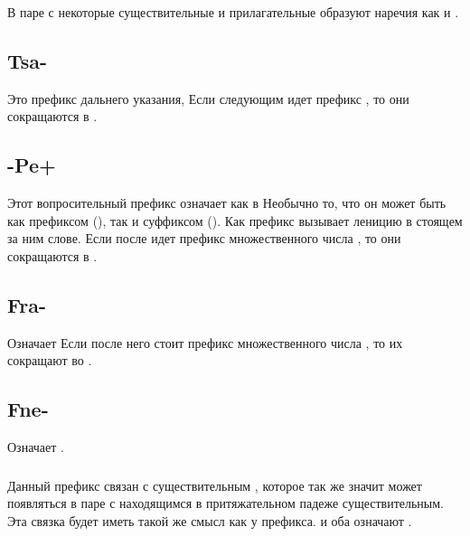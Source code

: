 \subsubsection{} В паре с  некоторые существительные и прилагательные образуют наречия как   и  .

\subsection{Tsa-} Это префикс дальнего указания,   Если следующим идет префикс , то они сокращаются в 
. 
 

\subsection{-Pe+} \label{morph:pre:pe} Этот вопросительный префикс означает
 как в    Необычно то, что он может быть как префиксом (), так и суффиксом ().
Как префикс вызывает леницию в стоящем за ним слове. Если после идет префикс множественного числа , то они сокращаются в .

\subsection{Fra-} Означает   Если после него стоит префикс множественного числа , то их сокращают во .
 

\subsection{Fne-} Означает .

\subsubsection{} Данный префикс связан с существительным , которое так же значит    может появляться в паре с находящимся в притяжательном падеже существительным. Эта связка будет иметь такой же смысл как у префикса.   и
 оба означают .

